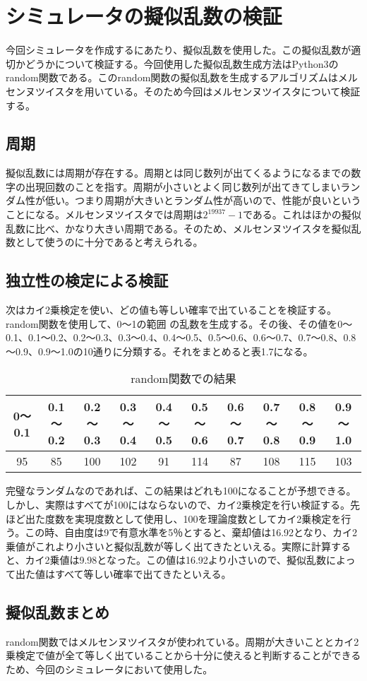 \section{シミュレータの擬似乱数の検証}
今回シミュレータを作成するにあたり、擬似乱数を使用した。この擬似乱数が適切かどうかについて検証する。今回使用した擬似乱数生成方法はPython3のrandom関数である。このrandom関数の擬似乱数を生成するアルゴリズムはメルセンヌツイスタを用いている。そのため今回はメルセンヌツイスタについて検証する。
\subsection{周期}
擬似乱数には周期が存在する。周期とは同じ数列が出てくるようになるまでの数字の出現回数のことを指す。周期が小さいとよく同じ数列が出てきてしまいランダム性が低い。つまり周期が大きいとランダム性が高いので、性能が良いということになる。メルセンヌツイスタでは周期は$2^{19937}-1$である。これはほかの擬似乱数に比べ、かなり大きい周期である。そのため、メルセンヌツイスタを擬似乱数として使うのに十分であると考えられる。
\subsection{独立性の検定による検証}
次はカイ2乗検定を使い、どの値も等しい確率で出ていることを検証する。random関数を使用して、0～1の範囲
の乱数を生成する。その後、その値を0～0.1、0.1～0.2、0.2～0.3、0.3～0.4、0.4～0.5、0.5～0.6、0.6～0.7、0.7～0.8、0.8～0.9、0.9～1.0の10通りに分類する。それをまとめると表1.7になる。
\begin{table}[H]
 \caption{random関数での結果}
 \begin{center}
  \begin{tabular}{|c|c|c|c|c|c|c|c|c|c|}
    \hline    0～0.1 &  0.1～0.2 & 0.2～0.3 & 0.3～0.4 &  0.4～0.5 & 0.5～0.6 & 0.6～0.7 & 0.7～0.8 & 0.8～0.9 & 0.9～1.0 \\
    \hline 95 & 85 & 100 & 102 & 91 & 114 & 87 & 108 & 115 & 103 \\
    \hline
  \end{tabular}
 \end{center}
\end{table}
完璧なランダムなのであれば、この結果はどれも100になることが予想できる。しかし、実際はすべてが100にはならないので、カイ2乗検定を行い検証する。先ほど出た度数を実現度数として使用し、100を理論度数としてカイ2乗検定を行う。この時、自由度は9で有意水準を5％とすると、棄却値は16.92となり、カイ2乗値がこれより小さいと擬似乱数が等しく出てきたといえる。実際に計算すると、カイ2乗値は9.98となった。この値は16.92より小さいので、擬似乱数によって出た値はすべて等しい確率で出てきたといえる。
\subsection{擬似乱数まとめ}
random関数ではメルセンヌツイスタが使われている。周期が大きいこととカイ2乗検定で値が全て等しく出ていることから十分に使えると判断することができるため、今回のシミュレータにおいて使用した。

